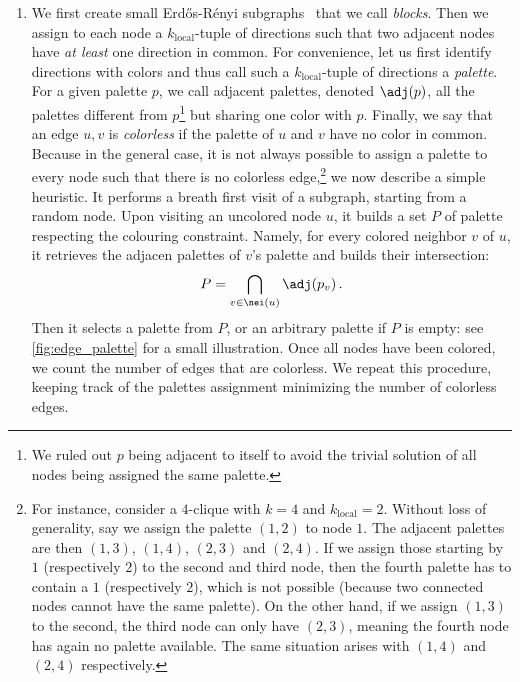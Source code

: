 \begin{enumerate}[1),leftmargin=*]
\item
We first create small Erdős-Rényi
subgraphs~\autocites{erdos1959random}{gilbertRG59} that we call \emph{blocks}. Then we
assign to each node a $k_\mathrm{local}$-tuple of
directions such that two adjacent nodes have \emph{at least} one direction in common.
For convenience, let us first identify directions with colors and
thus call such a $k_\mathrm{local}$-tuple of directions a \emph{palette}. For a given palette $p$,
we call adjacent palettes, denoted $\adj(p)$, all the palettes different from $p$\footnote{We ruled
out $p$ being adjacent to itself to avoid the trivial solution of all nodes being assigned the same
palette.} but sharing one
color with $p$. Finally, we say that an edge $u,v$ is \emph{colorless} if the palette of $u$ and $v$ have
no color in common. Because in the general case, it is not always possible to assign a palette to
every node such that there is no colorless edge,\footnote{For instance, consider a $4$-clique with $k=4$
and $k_\mathrm{local}=2$. Without loss of generality, say we assign the palette $(1,2)$ to node
$1$. The adjacent palettes are then $(1,3)$, $(1,4)$, $(2,3)$ and $(2,4)$. If we assign those
starting by $1$ (respectively $2$) to the second and third node, then the fourth palette has to
contain a $1$ (respectively $2$), which is not possible (because two connected nodes cannot have the
same palette). On the other hand, if we assign $(1,3)$ to the second, the third node can only have
$(2,3)$, meaning the fourth node has again no palette available. The same situation arises with $(1,4)$ and
$(2,4)$ respectively.} we now describe a simple heuristic. It performs a breath first visit of a subgraph,
starting from a random node. Upon visiting an uncolored node $u$, it builds a set $P$ of palette
respecting the colouring constraint. Namely, for every colored neighbor $v$ of $u$, it retrieves the
adjacen palettes of $v$'s palette and builds their intersection:
\begin{equation*}
  P=\bigcap_{v\in \nei(u)} \adj(p_v)\,.
\end{equation*}
Then it selects \uar{} a palette from $P$, or an arbitrary palette if $P$ is empty: see
\autoref{fig:edge_palette} for a small illustration. Once all nodes have been colored, we count the
number of edges that are colorless. We repeat this procedure, keeping track of the palettes assignment
minimizing the number of colorless edges.


\end{enumerate}
